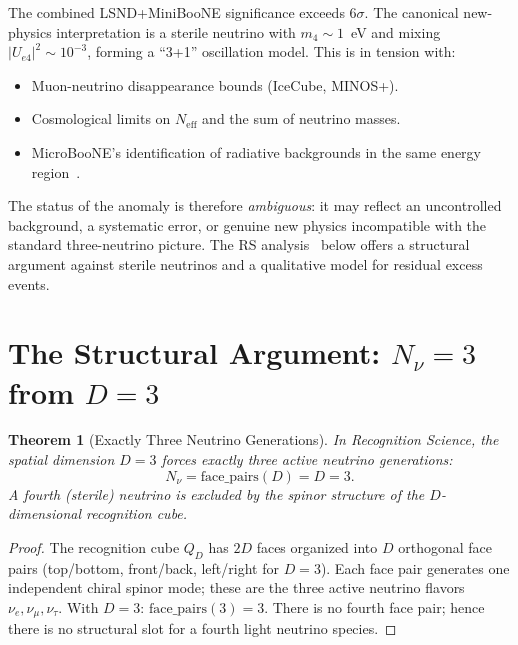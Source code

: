 \documentclass[12pt,a4paper]{article}
\newtheorem{theorem}{Theorem}[section]
\theoremstyle{definition}
\theoremstyle{remark}
\begin{document}
The combined LSND+MiniBooNE significance exceeds $6\sigma$.  The
canonical new-physics interpretation is a sterile neutrino with
$m_4 \sim 1$~eV and mixing $|U_{e4}|^2 \sim 10^{-3}$, forming a
``3+1'' oscillation model.  This is in tension with:
\begin{itemize}[nosep]
  \item Muon-neutrino disappearance bounds (IceCube, MINOS+).
  \item Cosmological limits on $N_{\mathrm{eff}}$ and the sum of
  neutrino masses.
  \item MicroBooNE's identification of radiative backgrounds in the
  same energy region~\cite{MicroBooNE2021}.
\end{itemize}

The status of the anomaly is therefore \emph{ambiguous}: it may reflect
an uncontrolled background, a systematic error, or genuine new physics
incompatible with the standard three-neutrino picture.  The RS
analysis~\cite{RS_Axioms} below offers a structural argument against
sterile neutrinos and a
qualitative model for residual excess events.

\section{The Structural Argument: $N_\nu = 3$ from $D = 3$}
\label{sec:structure}

\begin{theorem}[Exactly Three Neutrino Generations]
\label{thm:3nu}
In Recognition Science, the spatial dimension $D = 3$ forces exactly
three active neutrino generations:
\begin{equation}
  N_{\nu} = \mathrm{face\_pairs}(D) = D = 3.
\end{equation}
A fourth (sterile) neutrino is excluded by the spinor structure of the
$D$-dimensional recognition cube.
\end{theorem}

\begin{proof}
The recognition cube $Q_D$ has $2D$ faces organized into $D$ orthogonal
face pairs (top/bottom, front/back, left/right for $D = 3$).  Each
face pair generates one independent chiral spinor mode; these are the
three active neutrino flavors $\nu_e, \nu_\mu, \nu_\tau$.  With $D = 3$:
$\mathrm{face\_pairs}(3) = 3$.  There is no fourth face pair; hence
there is no structural slot for a fourth light neutrino species.
\end{proof}
\end{document}
